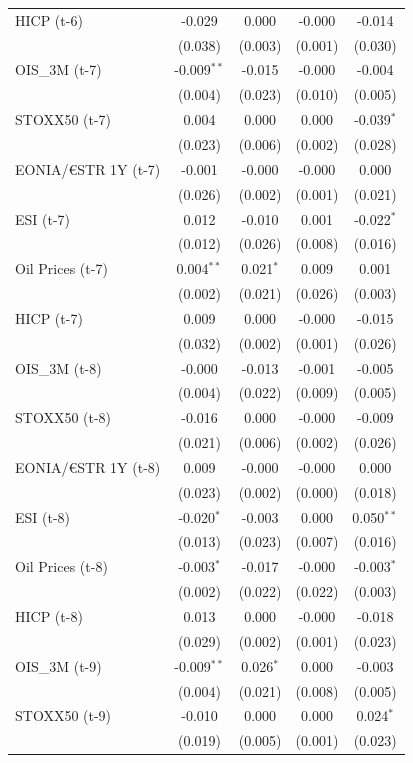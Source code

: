 \begin{longtable}[t]{lcccc}
HICP (t-6) & -0.029 & 0.000 & -0.000 & -0.014\\
 & (0.038) & (0.003) & (0.001) & (0.030)\\
OIS\_3M (t-7) & -0.009$^{**}$ & -0.015 & -0.000 & -0.004\\
 & (0.004) & (0.023) & (0.010) & (0.005)\\
STOXX50 (t-7) & 0.004 & 0.000 & 0.000 & -0.039$^{*}$\\
 & (0.023) & (0.006) & (0.002) & (0.028)\\
EONIA/€STR 1Y (t-7) & -0.001 & -0.000 & -0.000 & 0.000\\
 & (0.026) & (0.002) & (0.001) & (0.021)\\
ESI (t-7) & 0.012 & -0.010 & 0.001 & -0.022$^{*}$\\
 & (0.012) & (0.026) & (0.008) & (0.016)\\
Oil Prices (t-7) & 0.004$^{**}$ & 0.021$^{*}$ & 0.009 & 0.001\\
 & (0.002) & (0.021) & (0.026) & (0.003)\\
HICP (t-7) & 0.009 & 0.000 & -0.000 & -0.015\\
 & (0.032) & (0.002) & (0.001) & (0.026)\\
OIS\_3M (t-8) & -0.000 & -0.013 & -0.001 & -0.005\\
 & (0.004) & (0.022) & (0.009) & (0.005)\\
STOXX50 (t-8) & -0.016 & 0.000 & -0.000 & -0.009\\
 & (0.021) & (0.006) & (0.002) & (0.026)\\
EONIA/€STR 1Y (t-8) & 0.009 & -0.000 & -0.000 & 0.000\\
 & (0.023) & (0.002) & (0.000) & (0.018)\\
ESI (t-8) & -0.020$^{*}$ & -0.003 & 0.000 & 0.050$^{**}$\\
 & (0.013) & (0.023) & (0.007) & (0.016)\\
Oil Prices (t-8) & -0.003$^{*}$ & -0.017 & -0.000 & -0.003$^{*}$\\
 & (0.002) & (0.022) & (0.022) & (0.003)\\
HICP (t-8) & 0.013 & 0.000 & -0.000 & -0.018\\
 & (0.029) & (0.002) & (0.001) & (0.023)\\
OIS\_3M (t-9) & -0.009$^{**}$ & 0.026$^{*}$ & 0.000 & -0.003\\
 & (0.004) & (0.021) & (0.008) & (0.005)\\
STOXX50 (t-9) & -0.010 & 0.000 & 0.000 & 0.024$^{*}$\\
 & (0.019) & (0.005) & (0.001) & \vphantom{1} (0.023)\\

\end{longtable}
